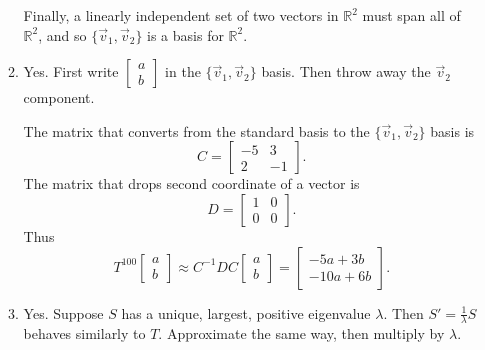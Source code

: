\documentclass[red]{tutorial}
\newcommand{\R}{\mathbb{R}}
\newcommand{\mat}[1]{\begin{bmatrix}#1\end{bmatrix}}
\theoremstyle{definition}
\theoremstyle{theorem}
\begin{document}
\begin{solutions}
\begin{enumerate}
\begin{enumerate}
					Finally, a linearly independent set of two vectors in $\R^2$ must span all of $\R^2$,
					and so $\{\vec v_1,\vec v_2\}$ is a basis for $\R^2$.
				\item Yes. First write $\mat{a\\b}$ in the $\{\vec v_1,\vec v_2\}$ basis. Then throw away
					the $\vec v_2$ component.

					The matrix that converts from the standard basis to the $\{\vec v_1,\vec v_2\}$ basis is
					\[
						C=\mat{-5&3\\2&-1}.
					\]
					The matrix that drops second coordinate of a vector is 
					\[
						D=\mat{1&0\\0&0}.
					\]
					Thus
					\[
						T^{100}\mat{a\\b} \approx C^{-1}DC\mat{a\\b}=\mat{-5a+3b\\-10a+6b}.
					\]
				\item Yes. Suppose $S$ has a unique, largest, positive eigenvalue $\lambda$. Then $S'=\tfrac{1}{\lambda}S$
					behaves similarly to $T$. Approximate the same way, then multiply by $\lambda$.
			\end{enumerate}
		\end{enumerate}
	\end{solutions}
\end{document}
